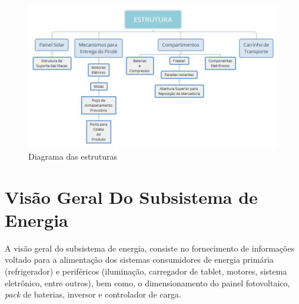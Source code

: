 \begin{figure}[H]
	\centering
    
    \includegraphics[width=\textwidth]{figuras/Vis_o_Geral_-_ESTRUTURA}
    \caption{Diagrama das estruturas}
    \label{fig:Vis_o_Geral_-_ESTRUTURA}
\end{figure}

\section{Visão Geral Do Subsistema de Energia}

	A visão geral do subsistema de energia, consiste no fornecimento de informações voltado para a alimentação dos sistemas consumidores de energia primária (refrigerador) e periféricos (iluminação, carregador de tablet, motores, sistema eletrônico, entre outros), bem como, o dimensionamento do painel fotovoltaico,  \textit{pack} de baterias, inversor e controlador de carga. 
   
